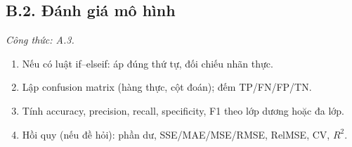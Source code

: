 \subsection*{B.2. Đánh giá mô hình}
\textit{Công thức: A.3.}
\begin{enumerate}
  \item Nếu có luật if--elseif: áp đúng thứ tự, đối chiếu nhãn thực.
  \item Lập confusion matrix (hàng thực, cột đoán); đếm TP/FN/FP/TN.
  \item Tính accuracy, precision, recall, specificity, F1 theo lớp dương hoặc đa lớp.
  \item Hồi quy (nếu đề hỏi): phần dư, SSE/MAE/MSE/RMSE, RelMSE, CV, \(R^2\).
\end{enumerate}
